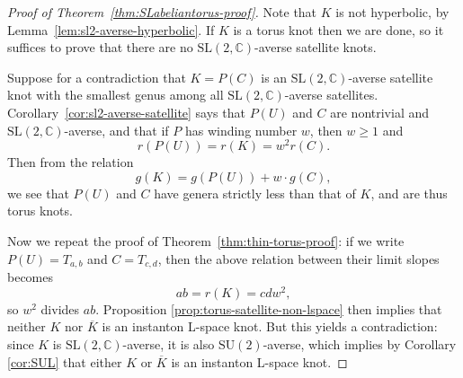 \documentclass[11pt]{amsart}
\numberwithin{equation}{section}
\numberwithin{theorem}{section}
\theoremstyle{definition}
\newcommand{\C}{\mathbb{C}}
\newcommand\SU{\mathrm{SU}}
\newcommand\SL{\mathrm{SL}}
\newcommand{\mirror}[1]{\overline{#1}}
\begin{document}
\begin{proof}[Proof of Theorem~\ref{thm:SLabeliantorus-proof}]
Note that $K$ is not hyperbolic, by Lemma~\ref{lem:sl2-averse-hyperbolic}. If $K$ is a torus knot then we are done, so it suffices to prove that there are no $\SL(2,\C)$-averse satellite knots. 

Suppose for a contradiction that $K=P(C)$ is an $\SL(2,\C)$-averse satellite knot with the smallest genus among all $\SL(2,\C)$-averse satellites. Corollary~\ref{cor:sl2-averse-satellite} says that $P(U)$ and $C$ are  nontrivial and $\SL(2,\C)$-averse, and that if $P$ has winding number $w$, then $w\geq 1$ and 
\[ r(P(U)) = r(K) = w^2 r(C). \]
Then from the relation
\[ g(K) = g(P(U)) + w\cdot g(C), \]
we see that $P(U)$ and $C$ have  genera strictly less than that of $K$, and are thus  torus knots. 

Now we repeat the proof of Theorem~\ref{thm:thin-torus-proof}: if we write $P(U) = T_{a,b}$ and $C = T_{c,d}$, then the above relation between their limit slopes becomes
\[ ab = r(K) = cd w^2, \]
so $w^2$ divides $ab$.  Proposition \ref{prop:torus-satellite-non-lspace} then implies that neither $K$ nor $\mirror{K}$ is an instanton L-space knot. But this yields a contradiction: since $K$ is $\SL(2,\C)$-averse, it is also $\SU(2)$-averse, which implies by Corollary \ref{cor:SUL} that either $K$ or  $\mirror{K}$ is an instanton L-space knot. 
\end{proof}

%



\end{document}
